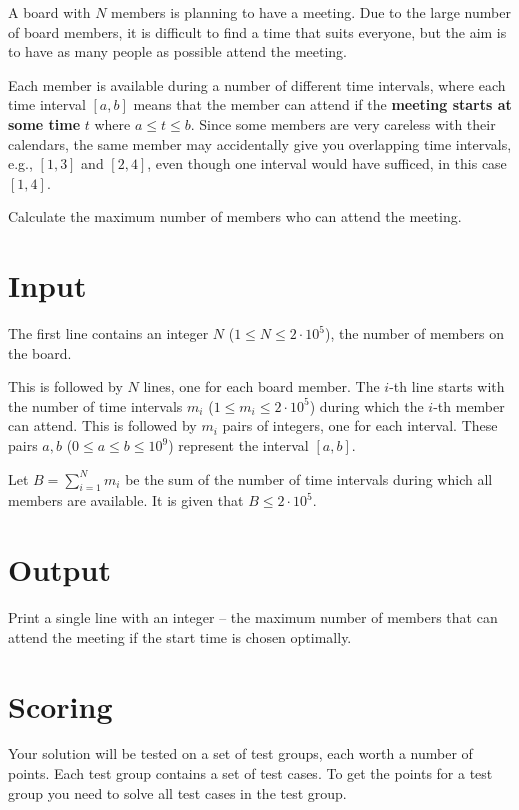 \noindent
A board with $N$ members is planning to have a meeting.
Due to the large number of board members, it is difficult to find a time that suits everyone, but the aim is to have as many people as possible attend the meeting.

Each member is available during a number of different time intervals, where each time interval $[a, b]$ means that the member can attend if the \textbf{meeting starts at some time} $t$ where $a \le t \le b$.
Since some members are very careless with their calendars, the same member may accidentally give you overlapping time intervals, e.g., $[1, 3]$ and $[2, 4]$, even though one interval would have sufficed, in this case $[1, 4]$.

Calculate the maximum number of members who can attend the meeting.

\section*{Input}
The first line contains an integer $N$ ($1 \le N \leq 2\cdot 10^5$), the number of members on the board.

This is followed by $N$ lines, one for each board member.
The $i$-th line starts with the number of time intervals $m_i$ ($1 \leq m_i \leq 2\cdot 10^5$) during which the $i$-th member can attend.
This is followed by $m_i$ pairs of integers, one for each interval.
These pairs $a, b$ ($0 \le a \le b \le 10^9$) represent the interval $[a, b]$.

Let $B=\sum_{i=1}^{N} m_i$ be the sum of the number of time intervals during which all members are available.
It is given that $B \leq 2\cdot 10^5$.

\section*{Output}
Print a single line with an integer -- the maximum number of members that can attend the meeting if the start time is chosen optimally.

\section*{Scoring}
Your solution will be tested on a set of test groups, each worth a number of points. Each test group contains
a set of test cases. To get the points for a test group you need to solve all test cases in the test group.


